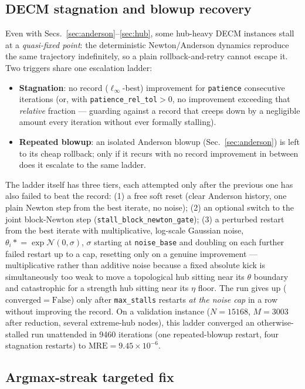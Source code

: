 \documentclass[10pt]{article}
\begin{document}
\subsection{DECM stagnation and blowup recovery}
\label{sec:decm-robustness}

Even with Secs.~\ref{sec:anderson}--\ref{sec:hub}, some hub-heavy DECM
instances stall at a \emph{quasi-fixed point}: the deterministic
Newton/Anderson dynamics reproduce the same trajectory indefinitely, so a
plain rollback-and-retry cannot escape it. Two triggers share one
escalation ladder:
\begin{itemize}[nosep]
\item \textbf{Stagnation}: no record ($\ell_\infty$-best) improvement for
\texttt{patience} consecutive iterations (or, with
\texttt{patience\_rel\_tol}$>0$, no improvement exceeding that
\emph{relative} fraction --- guarding against a record that creeps down by
a negligible amount every iteration without ever formally stalling).
\item \textbf{Repeated blowup}: an isolated Anderson blowup
(Sec.~\ref{sec:anderson}) is left to its cheap rollback; only if it recurs with
no record improvement in between does it escalate to the same ladder.
\end{itemize}
The ladder itself has three tiers, each attempted only after the previous
one has also failed to beat the record: (1) a free soft reset (clear
Anderson history, one plain Newton step from the best iterate, no noise);
(2) an optional switch to the joint block-Newton step (\texttt{stall\_block\_newton\_gate}); (3) a
perturbed restart from the best iterate with multiplicative,
log-scale Gaussian noise, $\theta_i \mathrel{*}= \exp\mathcal N(0,\sigma)$,
$\sigma$ starting at \texttt{noise\_base} and doubling on each further
failed restart up to a cap, resetting only on a genuine improvement ---
multiplicative rather than additive noise because a fixed absolute kick is
simultaneously too weak to move a topological hub sitting near its
$\theta$ boundary and catastrophic for a strength hub sitting near its
$\eta$ floor. The run gives up ($\mathrm{converged}=\mathrm{False}$) only
after \texttt{max\_stalls} restarts \emph{at the noise cap} in a row
without improving the record. On a validation instance ($N=15168$,
$M=3003$ after reduction, several extreme-hub nodes), this ladder
converged an otherwise-stalled run unattended in 9460 iterations
(one repeated-blowup restart, four stagnation restarts) to
$\mathrm{MRE}=9.45\times10^{-6}$.

\subsection{Argmax-streak targeted fix}
\label{sec:streak}
\end{document}
